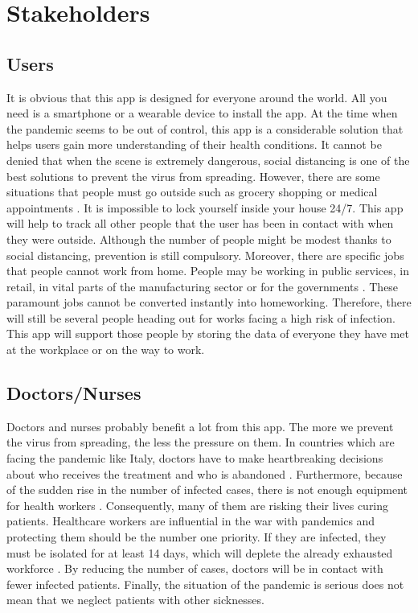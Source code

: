 \section{Stakeholders}
  \subsection{Users}
    \par It is obvious that this app is designed for everyone around the world. All you need is a smartphone or a wearable device to install the app. At the time when the pandemic seems to be out of control, this app is a considerable solution that helps users gain more understanding of their health conditions. It cannot be denied that when the scene is extremely dangerous, social distancing is one of the best solutions to prevent the virus from spreading. However, there are some situations that people must go outside such as grocery shopping or medical appointments \parencite{Stake1}. It is impossible to lock yourself inside your house 24/7. This app will help to track all other people that the user has been in contact with when they were outside. Although the number of people might be modest thanks to social distancing, prevention is still compulsory. Moreover, there are specific jobs that people cannot work from home. People may be working in public services, in retail, in vital parts of the manufacturing sector or for the governments \parencite{Stake2}. These paramount jobs cannot be converted instantly into homeworking. Therefore, there will still be several people heading out for works facing a high risk of infection. This app will support those people by storing the data of everyone they have met at the workplace or on the way to work.
  \subsection{Doctors/Nurses}
    \par Doctors and nurses probably benefit a lot from this app. The more we prevent the virus from spreading, the less the pressure on them. In countries which are facing the pandemic like Italy, doctors have to make heartbreaking decisions about who receives the treatment and who is abandoned \parencite{Stake3}. Furthermore, because of the sudden rise in the number of infected cases, there is not enough equipment for health workers \parencite{Stake4}. Consequently, many of them are risking their lives curing patients. Healthcare workers are influential in the war with pandemics and protecting them should be the number one priority. If they are infected, they must be isolated for at least 14 days, which will deplete the already exhausted workforce \parencite{Stake5}. By reducing the number of cases, doctors will be in contact with fewer infected patients. Finally, the situation of the pandemic is serious does not mean that we neglect patients with other sicknesses.
